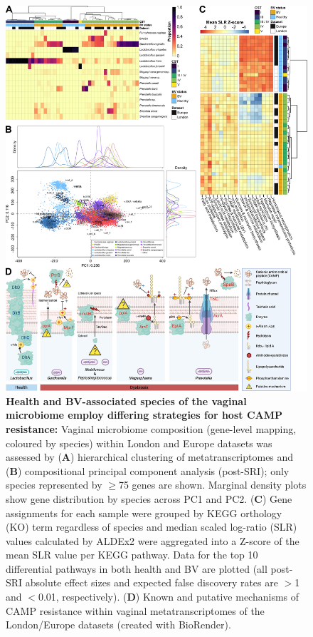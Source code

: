 \documentclass[sn-mathphys,Numbered]{sn-jnl}%
\begin{document}
\begin{figure}[H]
    \centering
    \includegraphics[scale=0.8]{0_multipanel_fig2_revised.png}
    \caption{\textbf{Health and BV-associated species of the vaginal microbiome employ differing strategies for host CAMP resistance:} Vaginal microbiome composition (gene-level mapping, coloured by species) within London and Europe datasets was assessed by (\textbf{A}) hierarchical clustering of metatranscriptomes and (\textbf{B}) compositional principal component analysis (post-SRI); only species represented by $\geq$75 genes are shown. Marginal density plots show gene distribution by species across PC1 and PC2. (\textbf{C}) Gene assignments for each sample were grouped by KEGG orthology (KO) term regardless of species and median scaled log-ratio (SLR) values calculated by ALDEx2 were aggregated into a Z-score of the mean SLR value per KEGG pathway. Data for the top 10 differential pathways in both health and BV are plotted (all post-SRI absolute effect sizes and expected false discovery rates are $>$1 and $<$0.01, respectively). (\textbf{D}) Known and putative mechanisms of CAMP resistance within vaginal metatranscriptomes of the London/Europe datasets (created with BioRender).}
    \label{fig:figLonEurSummary}
\end{figure}
\end{document}
